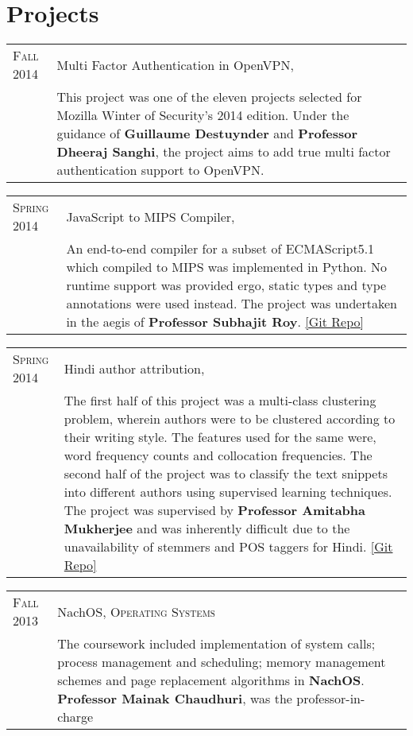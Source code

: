 \documentclass[a4paper,10pt]{article} %
\newcommand{\project}[3]{
    \begin{tabular}{>{\raggedleft}p{2.2cm}|p{17cm}}
        \textsc{#1} & #2 \\
                    & \footnotesize{#3} \\
    \end{tabular}
}
\begin{document}
\section{Projects}

\project {Fall 2014}
         {Multi Factor Authentication in OpenVPN, \textsc{\raggedright Mozilla Winter of Security}}
         {This project was one of the eleven projects selected for Mozilla Winter of Security's 2014 edition.
         Under the guidance of \textbf{Guillaume Destuynder} and \textbf{Professor Dheeraj Sanghi},
         the project aims to add true multi factor authentication support to OpenVPN.}

\project {Spring 2014}
         {JavaScript to MIPS Compiler, \textsc{\raggedright Compilers}}
         {An end-to-end compiler for a subset of ECMAScript5.1 which compiled to MIPS was implemented in Python.
          No runtime support was provided ergo, static types and type annotations were used instead.
          The project was undertaken in the aegis of \textbf{Professor Subhajit Roy}.
          \href{https://github.com/srijanshetty/javascript-compiler} {[Git Repo]}}

\project {Spring 2014}
         {Hindi author attribution, \textsc{\raggedright Artificial Intelligence}}
         {The first half of this project was a multi-class clustering problem,
          wherein authors were to be clustered according to their writing style.
          The features used for the same were, word frequency counts and collocation
          frequencies.  The second half of the project was to classify the text snippets
          into different authors using supervised learning techniques.
          The project was supervised by \textbf{Professor Amitabha Mukherjee} and was
          inherently difficult due to the unavailability of stemmers and POS taggers for Hindi.
          \href{https://github.com/srijanshetty/author-attribution} {[Git Repo]}}

\project {Fall 2013}
         {NachOS, \textsc{Operating Systems}}
         {The coursework included implementation of system calls; process
          management and scheduling; memory management schemes and page replacement
          algorithms in \textbf{NachOS}. \textbf{Professor Mainak Chaudhuri}, was
          the professor-in-charge}\\
\end{document}
